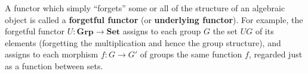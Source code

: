 A functor which simply ``forgets'' some or all of the structure of an algebraic object is called a \textbf{forgetful functor} (or \textbf{underlying functor}). For example, the forgetful functor $U: \mathbf{Grp} \rightarrow \mathbf{Set}$ assigns to each group $G$ the set $UG$ of its elements (forgetting the multiplication and hence the group structure), and assigns to each morphism $f: G \rightarrow G'$ of groups the same function $f$, regarded just as a function between sets.
